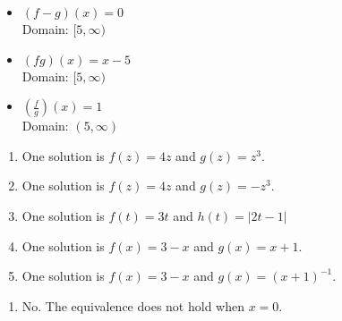 \begin{enumerate}
\begin{multicols}{2}
\begin{itemize}
      \vfill
      
      \columnbreak
      
\item $(f-g)(x) =0$ \\
       Domain: $[5,\infty)$


\end{itemize}

\end{multicols}

\begin{multicols}{2}

\begin{itemize}

\item $(fg)(x) =x-5$ \\
       Domain: $[5,\infty)$
      
      \vfill
      
      \columnbreak
      
\item $\left(\frac{f}{g}\right)(x) =1$ \\
       Domain: $(5,\infty)$


\end{itemize}

\end{multicols}

\setcounter{HW}{\value{enumi}}
\end{enumerate}

\newpage

\begin{enumerate}
\setcounter{enumi}{\value{HW}}

\item One solution is $f(z) = 4z$ and $g(z) = z^3$. 
\item One solution is $f(z) = 4z$ and $g(z) = - z^3$. 
\item One solution is  $f(t) = 3t$ and $h(t) = |2t-1|$ 
\item One solution is $f(x) = 3-x$ and $g(x) = x+1$.  
\item  One solution is $f(x) = 3-x$ and $g(x) = (x+1)^{-1}$.  

\setcounter{HW}{\value{enumi}}
\end{enumerate}

\begin{enumerate}
\setcounter{enumi}{\value{HW}}

\item No.  The equivalence does not hold when $x = 0$.

\setcounter{HW}{\value{enumi}}
\end{enumerate}




